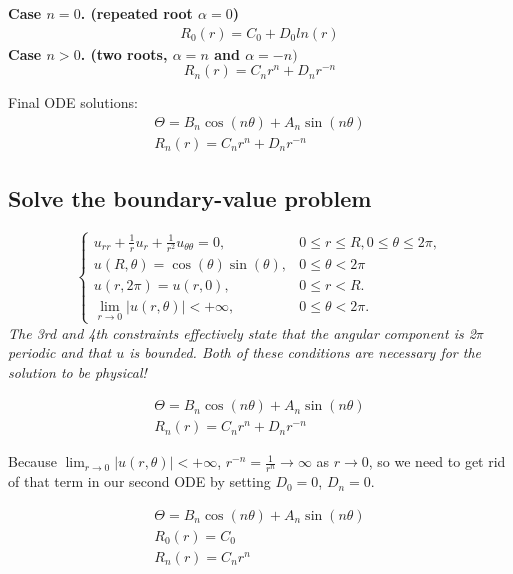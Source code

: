 \documentclass[11pt]{article}
\begin{document}
    \textbf{Case $n=0$. (repeated root $\alpha=0$)}
    \begin{gather*}
        R_0(r) = C_0 + D_0 ln(r)
    \end{gather*}
    \textbf{Case $n>0$. (two roots, $\alpha = n$ and $\alpha = -n)$}
    \[
        R_n(r) = C_n r^n + D_n r^{-n}
    \]

    Final ODE solutions:
    \begin{gather*}
        \Theta = B_n\cos(n\theta) + A_n\sin(n\theta)\\
        R_n(r) = C_n r^n + D_n r^{-n}
    \end{gather*}

    \subsection{Solve the boundary-value problem}
    \[
        \begin{cases}
            u_{rr} + \frac{1}{r}u_r + \frac{1}{r^2}u_{\theta \theta}=0, & 0 \le r \le R, 0 \le \theta \le 2\pi,\\
            u(R,\theta) = \cos(\theta)\sin(\theta), & 0 \le \theta < 2\pi\\
            u(r,2\pi) = u(r,0), & 0 \le r < R.\\
            \lim_{r\rightarrow0}|u(r,\theta)| < +\infty, & 0 \le \theta < 2\pi.
        \end{cases}
    \]
    \textit{The 3rd and 4th constraints effectively state that the angular component is 2$\pi$ periodic and that $u$ is bounded. Both of these conditions are necessary for the solution to be physical!}

    \begin{gather*}
        \Theta = B_n\cos(n\theta) + A_n\sin(n\theta)\\
        R_n(r) = C_n r^n + D_n r^{-n}
    \end{gather*}

    Because $\lim_{r\rightarrow0}|u(r,\theta)| < +\infty$, $r^{-n} = \frac{1}{r^n} \rightarrow \infty$ as $r \rightarrow 0$, so we need to get
    rid of that term in our second ODE by setting $D_0 = 0$, $D_n = 0$.

    \begin{gather*}
        \Theta = B_n\cos(n\theta) + A_n\sin(n\theta)\\
        R_0(r) = C_0\\
        R_n(r) = C_n r^n
    \end{gather*}
\end{document}
